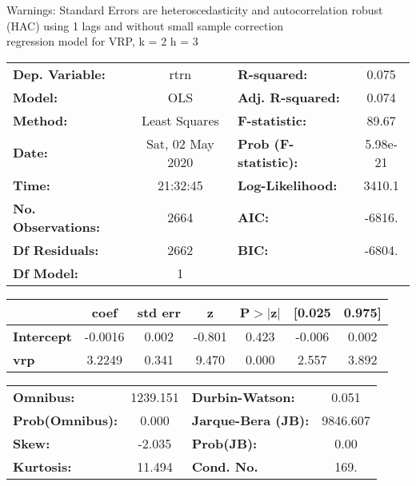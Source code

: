 Warnings: \newline
 [1] Standard Errors are heteroscedasticity and autocorrelation robust (HAC) using 1 lags and without small sample correction\\ 

regression model for VRP, k = 2 h = 3\begin{center}
\begin{tabular}{lclc}
\toprule
\textbf{Dep. Variable:}    &       rtrn       & \textbf{  R-squared:         } &     0.075   \\
\textbf{Model:}            &       OLS        & \textbf{  Adj. R-squared:    } &     0.074   \\
\textbf{Method:}           &  Least Squares   & \textbf{  F-statistic:       } &     89.67   \\
\textbf{Date:}             & Sat, 02 May 2020 & \textbf{  Prob (F-statistic):} &  5.98e-21   \\
\textbf{Time:}             &     21:32:45     & \textbf{  Log-Likelihood:    } &    3410.1   \\
\textbf{No. Observations:} &        2664      & \textbf{  AIC:               } &    -6816.   \\
\textbf{Df Residuals:}     &        2662      & \textbf{  BIC:               } &    -6804.   \\
\textbf{Df Model:}         &           1      & \textbf{                     } &             \\
\bottomrule
\end{tabular}
\begin{tabular}{lcccccc}
                   & \textbf{coef} & \textbf{std err} & \textbf{z} & \textbf{P$> |$z$|$} & \textbf{[0.025} & \textbf{0.975]}  \\
\midrule
\textbf{Intercept} &      -0.0016  &        0.002     &    -0.801  &         0.423        &       -0.006    &        0.002     \\
\textbf{vrp}       &       3.2249  &        0.341     &     9.470  &         0.000        &        2.557    &        3.892     \\
\bottomrule
\end{tabular}
\begin{tabular}{lclc}
\textbf{Omnibus:}       & 1239.151 & \textbf{  Durbin-Watson:     } &    0.051  \\
\textbf{Prob(Omnibus):} &   0.000  & \textbf{  Jarque-Bera (JB):  } & 9846.607  \\
\textbf{Skew:}          &  -2.035  & \textbf{  Prob(JB):          } &     0.00  \\
\textbf{Kurtosis:}      &  11.494  & \textbf{  Cond. No.          } &     169.  \\
\bottomrule
\end{tabular}
\end{center}

